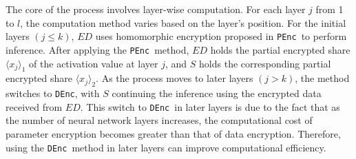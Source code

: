 \documentclass[conference]{IEEEtran}
\newcommand{\DEnc}{\texttt{DEnc}}
\newcommand{\PEnc}{\texttt{PEnc}}
\begin{document}
The core of the process involves layer-wise computation. For each layer $j$ from 1 to $l$, the computation method varies based on the layer's position. For the initial layers $(j \leq k)$, $ED$ uses homomorphic encryption proposed in \PEnc~to perform inference. After applying the \PEnc~method, $ED$ holds the partial encrypted share $\langle x_j \rangle_1$ of the activation value at layer $j$, and $S$ holds the corresponding partial encrypted share $\langle x_j \rangle_2$. As the process moves to later layers $(j > k)$, the method switches to \DEnc, with $S$ continuing the inference using the encrypted data received from $ED$. This switch to \DEnc~in later layers is due to the fact that as the number of neural network layers increases, the computational cost of parameter encryption becomes greater than that of data encryption. Therefore, using the \DEnc~method in later layers can improve computational efficiency.



\end{document}
